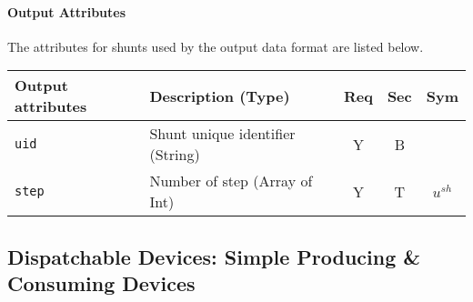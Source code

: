 \documentclass{article}
\begin{document}
\paragraph{Output Attributes} The attributes for shunts used by the output data format are listed below.

\begin{center}
\small
\begin{tabular}{ l | l | c | c | c |}
Output attributes & Description (Type) & Req & Sec & Sym\\
\hline
  {\tt uid} & Shunt unique identifier (String) & Y & B & \\
  {\tt step}      & Number of step (Array of Int)  & Y  & T &$u^{sh}$\\
\hline
\end{tabular}
\end{center}


\subsection{Dispatchable Devices: Simple Producing \& Consuming Devices}
\label{nom:gen_single}
\end{document}
